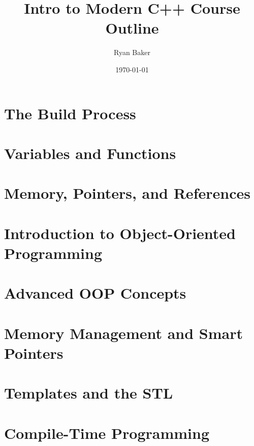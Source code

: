 \documentclass{article}
\title{Intro to Modern C++ Course Outline}
\author{Ryan Baker}
\date{\today}
\begin{document}
\maketitle

\section{The Build Process}

\section{Variables and Functions}

\section{Memory, Pointers, and References}

\section{Introduction to Object-Oriented Programming}

\section{Advanced OOP Concepts}

\section{Memory Management and Smart Pointers}

\section{Templates and the STL}

\section{Compile-Time Programming}
\end{document}
